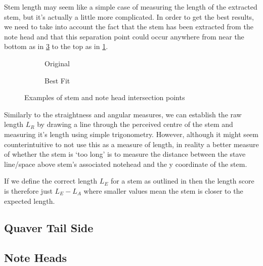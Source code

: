 Stem length may seem like a simple case of measuring the length of the extracted stem, but it's actually a little more complicated. In order to get the best results, we need to take into account the fact that the stem has been extracted from the note head and that this separation point could occur anywhere from near the bottom as in \cref{fig:stem-separation-bottom} to the top as in \cref{fig:stem-separation-top}.

\begin{figure}[h!]
    \centering

    \begin{subfigure}[b]{.3\linewidth}
        \centering
        \caption{Original}
        \label{fig:stem-separation-top}
    \end{subfigure}
    \begin{subfigure}[b]{.3\linewidth}
        \centering
        \caption{Best Fit}
        \label{fig:stem-separation-bottom}
    \end{subfigure}

    \caption{Examples of stem and note head intersection points}
\end{figure}

Similarly to the straightness and angular measures, we can establish the raw length $L_R$ by drawing a line through the perceived centre of the stem and measuring it's length using simple trigonometry. However, although it might seem counterintuitive to not use this as a measure of length, in reality a better measure of whether the stem is `too long' is to measure the distance between the stave line/space above stem's associated notehead and the y coordinate of the stem.

If we define the correct length $L_E$ for a stem as outlined in  then the length score is therefore just $L_E - L_A$ where smaller values mean the stem is closer to the expected length.

\subsection{Quaver Tail Side}

\subsection{Note Heads}

